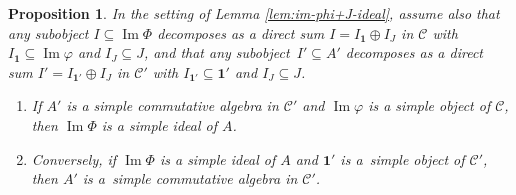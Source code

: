 \documentclass[pdftex]{sigma}
\numberwithin{equation}{section}
\newtheorem{Proposition}[Theorem]{Proposition}
\theoremstyle{definition}
\begin{document}
\begin{Proposition}\label{prop:A'-simple-A-almost-simple}
In the setting of Lemma {\rm\ref{lem:im-phi+J-ideal}}, assume also that any subobject $I\subseteq\operatorname{Im} \Phi$ decomposes as a direct sum $I=I_{\mathbf{1}}\oplus I_J$ in $\mathcal{C}$ with $I_{\mathbf{1}}\subseteq\operatorname{Im} \varphi$ and $I_J\subseteq J$, and that any subobject~${I'\subseteq A'}$ decomposes as a direct sum $I'=I_{\mathbf{1}'}\oplus I_J$ in $\mathcal{C}'$ with $I_{\mathbf{1}'}\subseteq\mathbf{1}'$ and $I_J\subseteq J$.
\begin{enumerate}\itemsep=0pt
\item[$(1)$] If $A'$ is a simple commutative algebra in $\mathcal{C}'$ and $\operatorname{Im} \varphi$ is a simple object of $\mathcal{C}$, then $\operatorname{Im} \Phi$ is a simple ideal of $A$.
\item[$(2)$] Conversely, if $\operatorname{Im} \Phi$ is a simple ideal of $A$ and $\mathbf{1}'$ is a~simple object of $\mathcal{C}'$, then $A'$ is a~simple commutative algebra in $\mathcal{C}'$.
\end{enumerate}
\end{Proposition}
\end{document}
